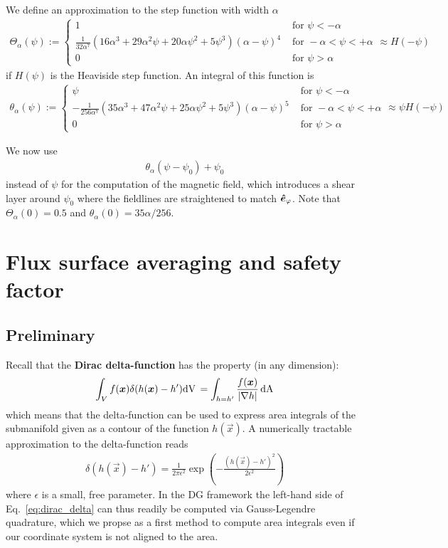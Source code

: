 We define an approximation to the step function with width $\alpha$
\begin{align}
\Theta_\alpha(\psi) := \begin{cases}
    1 & \text{ for } \psi < - \alpha  \\
    \frac{1}{32 \alpha^7}  \left(16 \alpha^3+29 \alpha^2 \psi+20 \alpha \psi^2+5 \psi^3\right) (\alpha-\psi)^4
    &\text{ for } -\alpha<\psi<+\alpha \\
    0 & \text{ for } \psi > \alpha 
\end{cases}
    \approx H(-\psi)
\label{eq:approx_heaviside}
\end{align}
if $H(\psi)$ is the Heaviside step function.
An integral of this function is
\begin{align}
\theta_\alpha(\psi) := \begin{cases}
\psi &\text{ for } \psi < -\alpha \\
    - \frac{1}{256 \alpha^7} \left(35 \alpha^3+47 \alpha^2 \psi+25 \alpha \psi^2+5 \psi^3\right) (\alpha-\psi)^5
     &\text{ for } -\alpha<\psi<+\alpha \\
    0 &\text{ for } \psi > \alpha
\end{cases}
    \approx \psi H(-\psi)
\end{align}

We now use 
\begin{align}
\theta_\alpha(\psi-\psi_0)+\psi_0
\label{eq:modified_psip}
\end{align}
instead of $\psi$ for the computation of the
magnetic field, which introduces a shear layer around $\psi_0$ where the
fieldlines are straightened to match $\bm{\hat{e}}_\varphi$.
Note that $\Theta_\alpha(0) = 0.5$ and $\theta_\alpha(0) = 35\alpha/256$.
\section{Flux surface averaging and safety factor}
\subsection{Preliminary}
Recall that the {\bf Dirac delta-function} has the property (in any dimension):
\begin{align} \label{eq:dirac_delta}
\int_V f({\boldsymbol{x}}) \delta(h({\boldsymbol{x}}) - h') \mathrm{dV}\, = \int_{h=h'} \frac{f({\boldsymbol{x}})}{|\nabla h|} \,\mathrm{dA}
\end{align}
which means that the delta-function can be used to express area integrals of the
submanifold given as a contour of the function $h(\vec x)$.
A numerically tractable approximation to the delta-function reads
\begin{align}\label{eq:delta}
\delta(h(\vec x)-h') = \frac{1}{2\pi \epsilon^2}
\exp\left( - \frac{\left(h(\vec x)-h'\right)^2}{2\epsilon^2}\right)
\end{align}
where $\epsilon$ is a small, free parameter.
In the DG framework the left-hand side
of Eq.~\eqref{eq:dirac_delta} can thus readily be computed
via Gauss-Legendre quadrature, which we propse as a first method to compute area
integrals even if our coordinate system is not aligned to the area.

